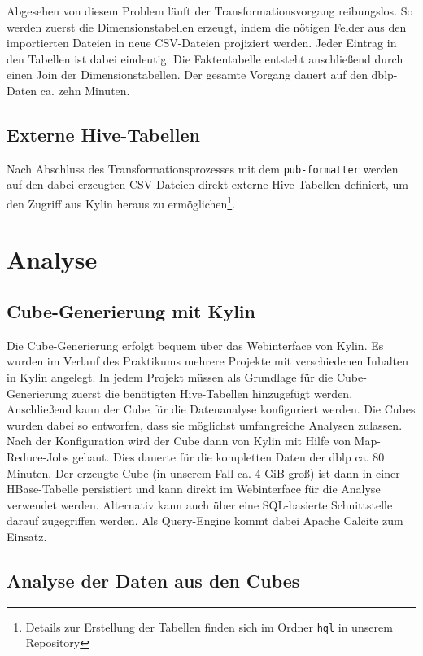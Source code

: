 \documentclass[a4paper,11pt,utf8]{scrartcl}
\begin{document}
Abgesehen von diesem Problem läuft der Transformationsvorgang reibungslos. So werden zuerst die Dimensionstabellen erzeugt, indem die nötigen Felder aus den importierten Dateien in neue CSV-Dateien projiziert werden. Jeder Eintrag in den Tabellen ist dabei eindeutig. Die Faktentabelle entsteht anschließend durch einen Join der Dimensionstabellen. Der gesamte Vorgang dauert auf den dblp-Daten ca. zehn Minuten.

\subsection{Externe Hive-Tabellen}

Nach Abschluss des Transformationsprozesses mit dem \texttt{pub-formatter} werden auf den dabei erzeugten CSV-Dateien direkt externe Hive-Tabellen definiert, um den Zugriff aus Kylin heraus zu ermöglichen\footnote{Details zur Erstellung der Tabellen finden sich im Ordner \texttt{hql} in unserem Repository}.

\section{Analyse}

\subsection{Cube-Generierung mit Kylin}

Die Cube-Generierung erfolgt bequem über das Webinterface von Kylin. Es wurden im Verlauf des Praktikums mehrere Projekte mit verschiedenen Inhalten in Kylin angelegt. In jedem Projekt müssen als Grundlage für die Cube-Generierung zuerst die benötigten Hive-Tabellen hinzugefügt werden. Anschließend kann der Cube für die Datenanalyse konfiguriert werden. Die Cubes wurden dabei so entworfen, dass sie möglichst umfangreiche Analysen zulassen. Nach der Konfiguration wird der Cube dann von Kylin mit Hilfe von Map-Reduce-Jobs gebaut. Dies dauerte für die kompletten Daten der dblp ca. 80 Minuten. Der erzeugte Cube (in unserem Fall ca. 4 GiB groß) ist dann in einer HBase-Tabelle persistiert und kann direkt im Webinterface für die Analyse verwendet werden. Alternativ kann auch über eine SQL-basierte Schnittstelle darauf zugegriffen werden. Als Query-Engine kommt dabei Apache Calcite zum Einsatz.

\subsection{Analyse der Daten aus den Cubes}
\end{document}
